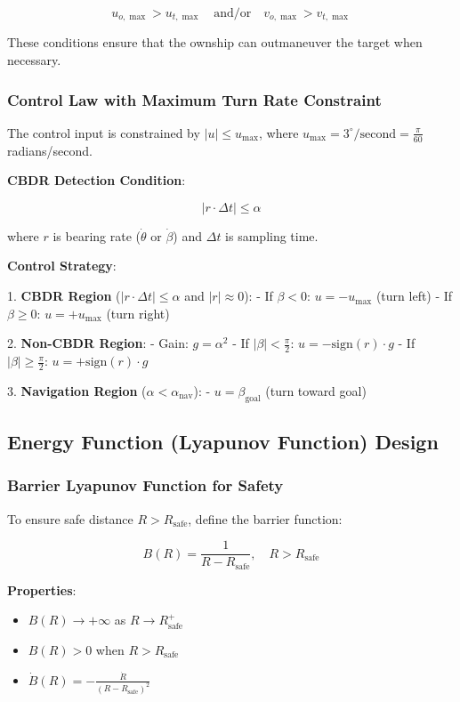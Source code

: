 \documentclass[11pt,a4paper]{article}
\numberwithin{equation}{section}
\begin{document}
\[
u_{o,\max} > u_{t,\max} \quad \text{and/or} \quad v_{o,\max} > v_{t,\max}
\]

These conditions ensure that the ownship can outmaneuver the target when necessary.

\subsubsection{Control Law with Maximum Turn Rate Constraint}

The control input is constrained by $|u| \leq u_{\max}$, where $u_{\max} = 3^\circ/\mathrm{second} = \frac{\pi}{60}$ radians/second.

\textbf{CBDR Detection Condition}:

\[
|r \cdot \Delta t| \leq \alpha
\]

where $r$ is bearing rate ($\dot{\theta}$ or $\dot{\beta}$) and $\Delta t$ is sampling time.

\textbf{Control Strategy}:

1. \textbf{CBDR Region} ($|r \cdot \Delta t| \leq \alpha$ and $|r| \approx 0$):
   - If $\beta < 0$: $u = -u_{\max}$ (turn left)
   - If $\beta \geq 0$: $u = +u_{\max}$ (turn right)

2. \textbf{Non-CBDR Region}:
   - Gain: $g = \alpha^2$
   - If $|\beta| < \frac{\pi}{2}$: $u = -\text{sign}(r) \cdot g$
   - If $|\beta| \geq \frac{\pi}{2}$: $u = +\text{sign}(r) \cdot g$

3. \textbf{Navigation Region} ($\alpha < \alpha_{\text{nav}}$):
   - $u = \beta_{\text{goal}}$ (turn toward goal)

\subsection{Energy Function (Lyapunov Function) Design}

\subsubsection{Barrier Lyapunov Function for Safety}

To ensure safe distance $R > R_{\text{safe}}$, define the barrier function:

\[
B(R) = \frac{1}{R - R_{\text{safe}}}, \quad R > R_{\text{safe}}
\]

\textbf{Properties}:
\begin{itemize}
\item $B(R) \to +\infty$ as $R \to R_{\text{safe}}^+$
\item $B(R) > 0$ when $R > R_{\text{safe}}$
\item $\dot{B}(R) = -\frac{\dot{R}}{(R - R_{\text{safe}})^2}$
\end{itemize}
\end{document}
